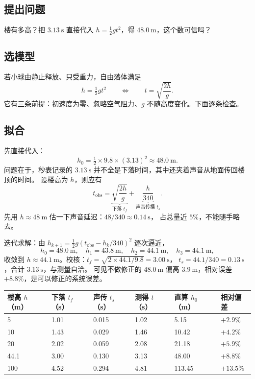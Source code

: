 \subsection{提出问题}
楼有多高？把 $3.13\ \mathrm{s}$ 直接代入 $h=\tfrac12gt^2$，得 $48.0\ \mathrm{m}$，这个数可信吗？

\subsection{选模型}
若小球由静止释放、只受重力，自由落体满足
\[
  h=\tfrac12gt^2\qquad\Longleftrightarrow\qquad t=\sqrt{\frac{2h}{g}}.
\]
它有三条前提：初速度为零、忽略空气阻力、$g$ 不随高度变化。下面逐条检查。

\subsection{拟合}
先直接代入：
\[
  h_0=\tfrac12\times9.8\times(3.13)^2\approx48.0\ \mathrm{m}.
\]
问题在于，秒表记录的 $3.13\ \mathrm{s}$ 并不全是下落时间，其中还夹着声音从地面传回楼顶的时间。
设楼高为 $h$，则应有
\[
  t_{\text{obs}}=\underbrace{\sqrt{\frac{2h}{g}}}_{\text{下落 }t_f}
               +\underbrace{\frac{h}{340}}_{\text{声音传播 }t_s}.
\]
先用 $h\approx48\ \mathrm{m}$ 估一下声音延迟：$48/340\approx0.14\ \mathrm{s}$，
占总量近 $5\%$，不能随手略去。

迭代求解：由 $h_{k+1}=\tfrac12g\left(t_{\text{obs}}-h_k/340\right)^2$ 逐次逼近，
\[
  h_0=48.0\ \mathrm{m},\quad
  h_1=43.8\ \mathrm{m},\quad
  h_2=44.1\ \mathrm{m},\quad
  h_3=44.1\ \mathrm{m},
\]
收敛到 $h\approx44.1\ \mathrm{m}$。校核：$t_f=\sqrt{2\times44.1/9.8}=3.00\ \mathrm{s}$，
$t_s=44.1/340=0.13\ \mathrm{s}$，合计 $3.13\ \mathrm{s}$，与测量自洽。
可见不做修正的 $48.0\ \mathrm{m}$ 偏高 $3.9\ \mathrm{m}$，相对误差 $+8.8\%$，是可以修正的系统误差。

\begin{center}
\footnotesize
\setlength{\tabcolsep}{4pt}
\renewcommand{\arraystretch}{1.4}
\begin{tabular}{p{1.6cm}p{1.6cm}p{1.6cm}p{1.8cm}p{2.2cm}p{1.8cm}}
\toprule
楼高 $h$（m） & 下落 $t_f$（s） & 声传 $t_s$（s） & 测得 $t$（s） & 直算 $h_0$（m） & 相对偏差 \\
\midrule
5    & 1.01 & 0.015 & 1.02 & 5.15   & $+2.9\%$ \\
10   & 1.43 & 0.029 & 1.46 & 10.42  & $+4.2\%$ \\
20   & 2.02 & 0.059 & 2.08 & 21.18  & $+5.9\%$ \\
44.1 & 3.00 & 0.130 & 3.13 & 48.00  & $+8.8\%$ \\
100  & 4.52 & 0.294 & 4.81 & 113.45 & $+13.5\%$ \\
\bottomrule
\end{tabular}
\end{center}

